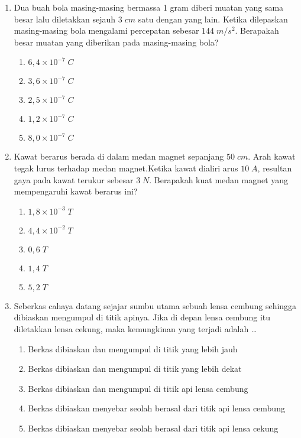 \documentclass[A4,12PT, english, twocolumn]{journal}
\begin{document}
\begin{enumerate}
\item Dua buah bola masing-masing bermassa 1 gram diberi muatan yang sama besar lalu diletakkan sejauh $3 \; cm $ satu dengan yang lain. Ketika dilepaskan masing-masing bola mengalami percepatan sebesar $144 \; m/s^2$. Berapakah besar muatan yang diberikan pada masing-masing bola?
    \begin{enumerate}
        \item $6,4 \times 10^{-7} \; C$
        \item $3,6 \times 10^{-7} \; C$
        \item $2,5 \times 10^{-7} \; C$
        \item $1,2 \times 10^{-7} \; C$
        \item $8,0 \times 10^{-7} \; C$
    \end{enumerate}
  
\item Kawat berarus berada di dalam medan magnet sepanjang $50 \; cm$. Arah kawat tegak lurus terhadap medan magnet.Ketika kawat dialiri arus $10 \; A$, resultan gaya pada kawat terukur sebesar $3 \; N$. Berapakah kuat medan magnet yang mempengaruhi kawat berarus ini?
    \begin{enumerate}
        \item $1,8 \times 10^{-3} \; T$
        \item $4,4 \times 10^{-2} \; T$
        \item $0,6 \; T$
        \item $1,4 \; T$
        \item $5,2 \; T$
    \end{enumerate}
    
\item Seberkas cahaya datang sejajar sumbu utama sebuah lensa cembung sehingga dibiaskan mengumpul di titik apinya. Jika di depan lensa cembung itu diletakkan lensa cekung, maka kemungkinan yang terjadi adalah \dots
    \begin{enumerate}
        \item Berkas dibiaskan dan mengumpul di titik yang lebih jauh
        \item Berkas dibiaskan dan mengumpul di titik yang lebih dekat
        \item Berkas dibiaskan dan mengumpul di titik api lensa cembung
        \item Berkas dibiaskan menyebar seolah berasal dari titik api lensa cembung
        \item Berkas dibiaskan menyebar seolah berasal dari titik api lensa cekung
    \end{enumerate}


\end{enumerate}
\end{document}
